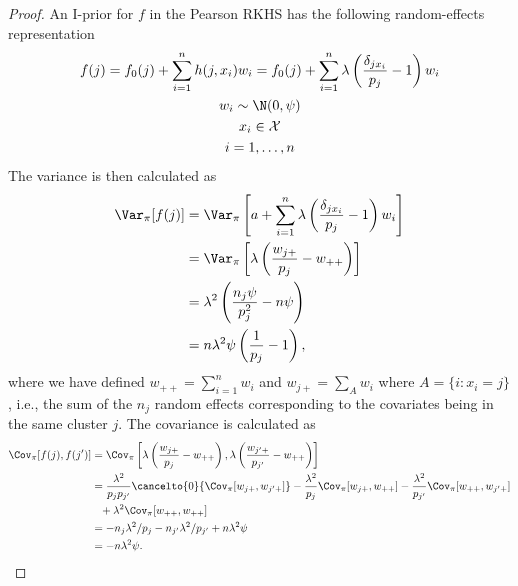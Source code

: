 \documentclass[english, 11pt]{article}
\begin{document}
\begin{proof}
	An I-prior for $f$ in the Pearson RKHS has the following random-effects representation
	\begin{align*}
		\begin{gathered}
			f(j) = f_0(j) + \sum_{i=1}^n h(j, x_i)w_i = f_0(j) + \sum_{i=1}^n \lambda\left(\frac{\delta_{jx_i}}{p_j} - 1 \right)w_i \\
			w_i \sim \N(0, \psi) \\
			x_i \in \mathcal X \\
			i = 1, \dots, n \\
		\end{gathered}
	\end{align*}
	The variance is then calculated as 
	\begin{align*}
		\Var_\pi[f(j)] &= \Var_\pi \left[ a + \sum_{i=1}^n \lambda\left(\frac{\delta_{jx_i}}{p_j} - 1 \right)w_i \right ] \\
		&= \Var_\pi \left[ \lambda\left(\frac{w_{j+}}{p_j} - w_{++} \right) \right ] \\
		&= \lambda^2 \left( \frac{n_j\psi}{p_j^2} - n\psi \right) \\
		&= n\lambda^2 \psi  \left(\frac{1}{p_j} - 1 \right),
	\end{align*}
	where we have defined $w_{++} = \sum_{i=1}^n w_i$ and $w_{j+} = \sum_{A} w_i$ where $A = \{i: x_i = j \}$, i.e., the sum of the $n_j$ random effects corresponding to the covariates being in the same cluster $j$. The covariance is calculated as
	\begin{align*}
		\Cov_\pi[f(j), f(j')] &= \Cov_\pi \left[ \lambda\left(\frac{w_{j+}}{p_j} - w_{++} \right),  \lambda\left(\frac{w_{j'+}}{p_{j'}} - w_{++} \right) \right ] \\
		&= \frac{\lambda^2}{p_j p_{j'}} \cancelto{0}{\Cov_\pi [w_{j+}, w_{j'+}]} - \frac{\lambda^2}{p_j} \Cov_\pi [w_{j+}, w_{++}] - \frac{\lambda^2}{p_{j'}} \Cov_\pi [w_{++}, w_{j'+}] \\
		&\hphantom{= } + \lambda^2 \Cov_\pi [w_{++}, w_{++}] \\
		&= - n_j \lambda^2 / p_j - n_{j'} \lambda^2 / p_{j'} + n \lambda^2 \psi \\
		&= - n\lambda^2 \psi.
	\end{align*}	
\end{proof}

\nocite{*}


\end{document}

